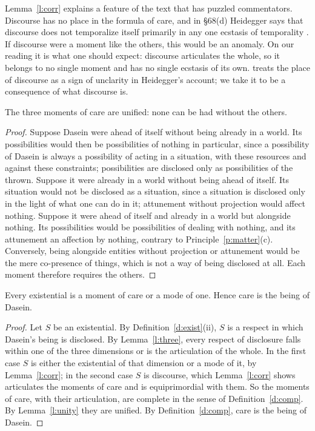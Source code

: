 \documentclass{situationist-preprint}
\begin{document}
Lemma~\ref{l:corr} explains a feature of the text that has puzzled commentators. Discourse has no place in the formula of care, and in \S68(d) Heidegger says that discourse does not temporalize itself primarily in any one ecstasis of temporality \citep[\S68]{Heidegger1927}. If discourse were a moment like the others, this would be an anomaly. On our reading it is what one should expect: discourse articulates the whole, so it belongs to no single moment and has no single ecstasis of its own. \citet{Dreyfus1991} treats the place of discourse as a sign of unclarity in Heidegger's account; we take it to be a consequence of what discourse is.

\begin{lemma}[Unity]\label{l:unity}
The three moments of care are unified: none can be had without the others.
\end{lemma}

\begin{proof}
Suppose Dasein were ahead of itself without being already in a world. Its possibilities would then be possibilities of nothing in particular, since a possibility of Dasein is always a possibility of acting in a situation, with these resources and against these constraints; possibilities are disclosed only as possibilities of the thrown. Suppose it were already in a world without being ahead of itself. Its situation would not be disclosed as a situation, since a situation is disclosed only in the light of what one can do in it; attunement without projection would affect nothing. Suppose it were ahead of itself and already in a world but alongside nothing. Its possibilities would be possibilities of dealing with nothing, and its attunement an affection by nothing, contrary to Principle~\ref{p:matter}(c). Conversely, being alongside entities without projection or attunement would be the mere co-presence of things, which is not a way of being disclosed at all. Each moment therefore requires the others.
\end{proof}

\begin{theorem}[Completeness]\label{t:comp}
Every existential is a moment of care or a mode of one. Hence care is the being of Dasein.
\end{theorem}

\begin{proof}
Let $S$ be an existential. By Definition~\ref{d:exist}(ii), $S$ is a respect in which Dasein's being is disclosed. By Lemma~\ref{l:three}, every respect of disclosure falls within one of the three dimensions or is the articulation of the whole. In the first case $S$ is either the existential of that dimension or a mode of it, by Lemma~\ref{l:corr}; in the second case $S$ is discourse, which Lemma~\ref{l:corr} shows articulates the moments of care and is equiprimordial with them. So the moments of care, with their articulation, are complete in the sense of Definition~\ref{d:comp}. By Lemma~\ref{l:unity} they are unified. By Definition~\ref{d:comp}, care is the being of Dasein.
\end{proof}
\end{document}
